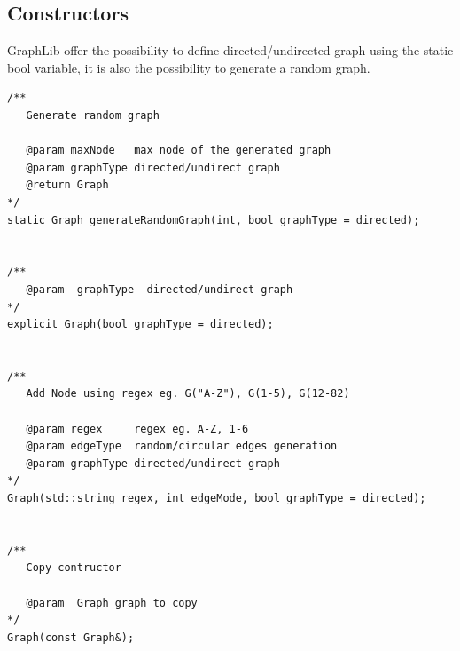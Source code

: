 \documentclass[10pt,a4paper]{article}
\begin{document}
\subsection{Constructors}
GraphLib offer the possibility to define directed/undirected graph using the static bool variable, it is also the possibility to generate a random graph.\\
\begin{lstlisting}
/** 
   Generate random graph
   
   @param maxNode   max node of the generated graph
   @param graphType directed/undirect graph
   @return Graph
*/
static Graph generateRandomGraph(int, bool graphType = directed); 


/**
   @param  graphType  directed/undirect graph
*/
explicit Graph(bool graphType = directed);
  
   
/**
   Add Node using regex eg. G("A-Z"), G(1-5), G(12-82)

   @param regex     regex eg. A-Z, 1-6
   @param edgeType  random/circular edges generation
   @param graphType directed/undirect graph
*/ 
Graph(std::string regex, int edgeMode, bool graphType = directed);  


/**
   Copy contructor

   @param  Graph graph to copy
*/
Graph(const Graph&); 
\end{lstlisting}
\end{document}
